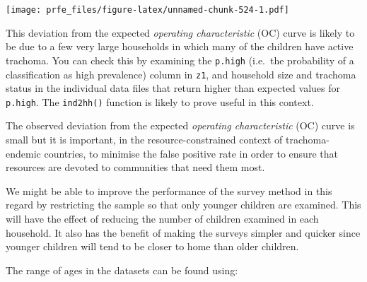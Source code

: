 \documentclass[12pt,a4paper]{book}
\newenvironment{Shaded}{\begin{snugshade}}{\end{snugshade}}
\newcommand{\KeywordTok}[1]{\textcolor[rgb]{0.13,0.29,0.53}{\textbf{#1}}}
\newcommand{\DataTypeTok}[1]{\textcolor[rgb]{0.13,0.29,0.53}{#1}}
\newcommand{\CharTok}[1]{\textcolor[rgb]{0.31,0.60,0.02}{#1}}
\newcommand{\StringTok}[1]{\textcolor[rgb]{0.31,0.60,0.02}{#1}}
\newcommand{\OtherTok}[1]{\textcolor[rgb]{0.56,0.35,0.01}{#1}}
\newcommand{\ControlFlowTok}[1]{\textcolor[rgb]{0.13,0.29,0.53}{\textbf{#1}}}
\newcommand{\OperatorTok}[1]{\textcolor[rgb]{0.81,0.36,0.00}{\textbf{#1}}}
\newcommand{\NormalTok}[1]{#1}
\theoremstyle{definition}
\theoremstyle{definition}
\theoremstyle{definition}
\theoremstyle{remark}
\begin{document}
\texttt{[image: prfe\_files/figure-latex/unnamed-chunk-524-1.pdf]}

This deviation from the expected \emph{operating characteristic} (OC)
curve is likely to be due to a few very large households in which many
of the children have active trachoma. You can check this by examining
the \texttt{p.high} (i.e.~the probability of a classification as high
prevalence) column in \texttt{z1}, and household size and trachoma
status in the individual data files that return higher than expected
values for \texttt{p.high}. The \texttt{ind2hh()} function is likely to
prove useful in this context.

The observed deviation from the expected \emph{operating characteristic}
(OC) curve is small but it is important, in the resource-constrained
context of trachoma-endemic countries, to minimise the false positive
rate in order to ensure that resources are devoted to communities that
need them most.

We might be able to improve the performance of the survey method in this
regard by restricting the sample so that only younger children are
examined. This will have the effect of reducing the number of children
examined in each household. It also has the benefit of making the
surveys simpler and quicker since younger children will tend to be
closer to home than older children.

The range of ages in the datasets can be found using:

\begin{Shaded}
\end{Shaded}
\end{document}
